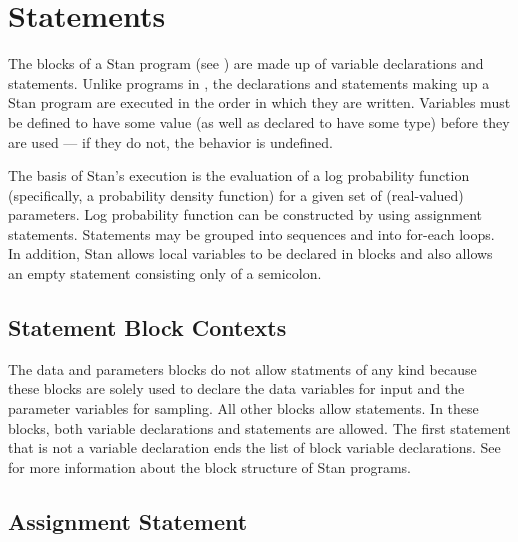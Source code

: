 \chapter{Statements}

\noindent
The blocks of a Stan program (see ) are made up of
variable declarations and statements.  Unlike programs in \BUGS, the
declarations and statements making up a Stan program are executed in
the order in which they are written.  Variables must be defined to
have some value (as well as declared to have some type) before they
are used --- if they do not, the behavior is undefined.

The basis of Stan's execution is the evaluation of a log probability
function (specifically, a probability density function) for a given
set of (real-valued) parameters. Log probability function can be
constructed by using assignment statements.  Statements may be grouped
into sequences and into for-each loops.  In addition, Stan allows
local variables to be declared in blocks and also allows an empty
statement consisting only of a semicolon.

\section{Statement Block Contexts}

The data and parameters blocks do not allow statments of any kind
because these blocks are solely used to declare the data variables for
input and the parameter variables for sampling.  All other blocks
allow statements.  In these blocks, both variable declarations and
statements are allowed.  The first statement that is not a variable
declaration ends the list of block variable declarations.  See
 for more information about the block structure of
Stan programs.


\section{Assignment Statement}\label{assignment-statement.section}

